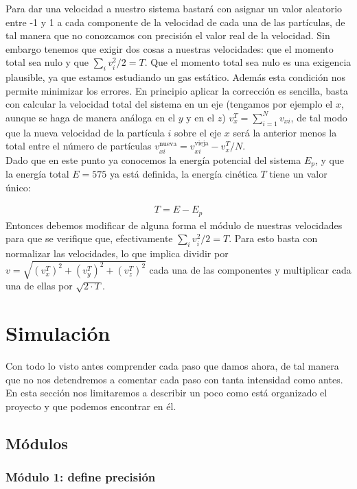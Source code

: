 \documentclass[11pt]{article}
\begin{document}
Para dar una velocidad a nuestro sistema bastará con asignar un valor aleatorio entre -1 y 1 a cada componente de la velocidad de cada una de las partículas, de tal manera que no conozcamos con precisión el valor real de la velocidad. Sin embargo tenemos que exigir dos cosas a nuestras velocidades: que el momento total sea nulo y que $\sum_i v_i^2/2 = T$. Que el momento total sea nulo es una exigencia plausible, ya que estamos estudiando un gas estático. Además esta condición nos permite minimizar los errores. En principio aplicar la corrección es sencilla, basta con calcular la velocidad total del sistema en un eje (tengamos por ejemplo el $x$, aunque se haga de manera análoga en el $y$ y en el $z$) $v_{x}^T = \sum_{i=1}^N v_{xi}$, de tal modo que la nueva velocidad de la partícula $i$ sobre el eje $x$ será la anterior menos la total entre el número de partículas $v_{xi}^{\text{nueva}}=v_{xi}^{\text{vieja}}-v_x^T/N$. \\

Dado que en este punto ya conocemos la energía potencial del sistema $E_p$, y que la energía total $E=575$ ya está definida, la energía cinética $T$ tiene un valor único:

\begin{eqnarray}
	T=E-E_p
\end{eqnarray}
Entonces debemos modificar de alguna forma el módulo de nuestras velocidades para que se verifique que, efectivamente $\sum_i v_i^2/2 = T$. Para esto basta con normalizar las velocidades, lo que implica dividir por $v=\sqrt{(v_x^T)^2+(v_y^T)^2+(v_z^T)^2}$ cada una de las componentes y multiplicar cada una de ellas por $\sqrt{2\cdot T}$. 
	 
\section{Simulación} \label{Sec:03}

Con todo lo visto antes comprender cada paso que damos ahora, de tal manera que no nos detendremos a comentar cada paso con tanta intensidad como antes. En esta sección nos limitaremos a describir un poco como está organizado el proyecto y que podemos encontrar en él. 

\subsection{Módulos}

\subsubsection{Módulo 1: define precisión}
\end{document}
